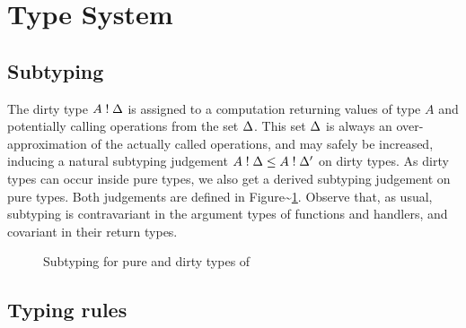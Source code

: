 \documentclass[master=cws,masteroption=ai, english]{kulemt}
\begin{document}
\section{Type System}\label{type-system}

\subsection{Subtyping}\label{subtyping}

The dirty type \(A \mathrel{!} \Delta\) is assigned to a computation returning
values of type \(A\) and potentially calling operations from the set
\(\Delta\). This set \(\Delta\) is always an over-approximation of the
actually called operations, and may safely be increased, inducing a
natural subtyping judgement \(A \mathrel{!} \Delta \leq A \mathrel{!} \Delta'\) on dirty
types. As dirty types can occur inside pure types, we also get a derived
subtyping judgement on pure types. Both judgements are defined in
Figure\textasciitilde{}\ref{fig:subtyping}. Observe that, as usual,
subtyping is contravariant in the argument types of functions and
handlers, and covariant in their return types.

\begin{figure}[h]
\begin{center}
\end{center}
\caption{Subtyping for pure and dirty types of \eff}\label{fig:subtyping}
\end{figure}

\subsection{Typing rules}\label{typing-rules}
\end{document}
